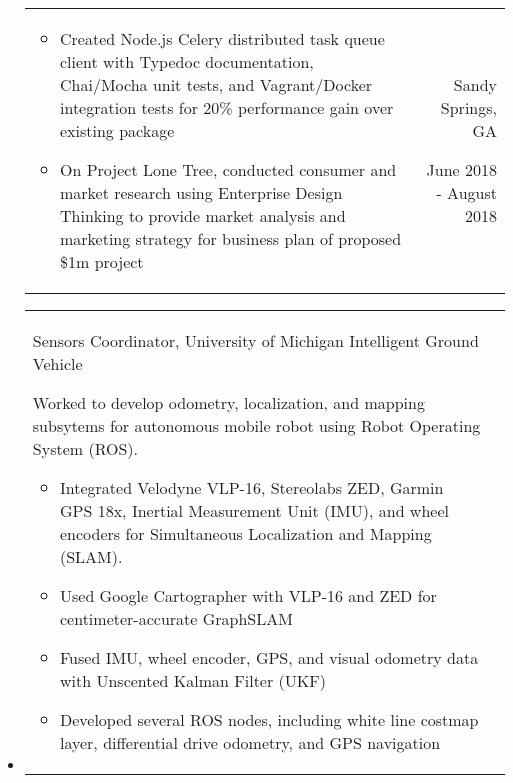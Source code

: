 \documentclass[9pt]{memoir}
\begin{document}
\begin{itemize}
\begin{tabular}[t]{lr}
\begin{minipage}[t]{0.7 \textwidth}
\begin{itemize}
\item Created Node.js Celery distributed task queue client with Typedoc documentation, Chai/Mocha
      unit tests, and Vagrant/Docker integration tests for 20\% performance gain over existing
      package
\item On Project Lone Tree, conducted consumer and market research using Enterprise Design Thinking
      to provide market analysis and marketing strategy for business plan of proposed \$1m project
\end{itemize}

\end{minipage}

&

\begin{minipage}[t]{0.2 \textwidth}
\raggedleft

\normalsize
Sandy Springs, GA

\small
June 2018 - August 2018
\end{minipage}

\\

\end{tabular}

\item

\begin{tabular}[t]{lr}

\begin{minipage}[t]{0.7 \textwidth}
\raggedright

\normalsize
Sensors Coordinator, University of Michigan Intelligent Ground Vehicle

\small

Worked to develop odometry, localization, and mapping subsytems for autonomous mobile robot
using Robot Operating System (ROS).

\begin{itemize}
\item Integrated Velodyne VLP-16, Stereolabs ZED, Garmin GPS 18x, Inertial Measurement Unit (IMU),
      and wheel encoders for Simultaneous Localization and Mapping (SLAM).
\item Used Google Cartographer with VLP-16 and ZED for centimeter-accurate GraphSLAM
\item Fused IMU, wheel encoder, GPS, and visual odometry data with Unscented Kalman Filter (UKF)
\item Developed several ROS nodes, including white line costmap layer, differential drive odometry, and GPS navigation
\end{itemize}


\end{minipage}
\end{tabular}
\end{itemize}
\end{document}
